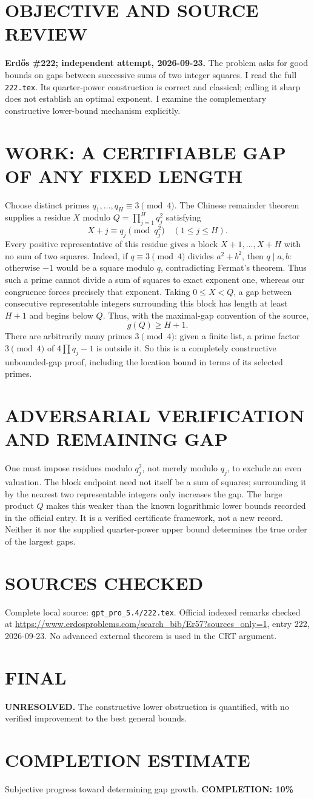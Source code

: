 \section{OBJECTIVE AND SOURCE REVIEW}
\textbf{Erd\H{o}s \#222; independent attempt, 2026-09-23.}
The problem asks for good bounds on gaps between successive sums of two integer squares. I read the full \texttt{222.tex}. Its quarter-power construction is correct and classical; calling it sharp does not establish an optimal exponent. I examine the complementary constructive lower-bound mechanism explicitly.
\section{WORK: A CERTIFIABLE GAP OF ANY FIXED LENGTH}
Choose distinct primes $q_1,\ldots,q_H\equiv3\pmod4$. The Chinese remainder theorem supplies a residue $X$ modulo $Q=\prod_{j=1}^Hq_j^2$ satisfying
\[
X+j\equiv q_j\pmod {q_j^2}\quad(1\le j\le H).
\]
Every positive representative of this residue gives a block $X+1,\ldots,X+H$ with no sum of two squares. Indeed, if $q\equiv3\pmod4$ divides $a^2+b^2$, then $q\mid a,b$: otherwise $-1$ would be a square modulo $q$, contradicting Fermat's theorem. Thus such a prime cannot divide a sum of squares to exact exponent one, whereas our congruence forces precisely that exponent.
Taking $0\le X<Q$, a gap between consecutive representable integers surrounding this block has length at least $H+1$ and begins below $Q$. Thus, with the maximal-gap convention of the source,
\[
g(Q)\ge H+1.
\]
There are arbitrarily many primes $3\pmod4$: given a finite list, a prime factor $3\pmod4$ of $4\prod q_j-1$ is outside it. So this is a completely constructive unbounded-gap proof, including the location bound in terms of its selected primes.
\section{ADVERSARIAL VERIFICATION AND REMAINING GAP}
One must impose residues modulo $q_j^2$, not merely modulo $q_j$, to exclude an even valuation. The block endpoint need not itself be a sum of squares; surrounding it by the nearest two representable integers only increases the gap. The large product $Q$ makes this weaker than the known logarithmic lower bounds recorded in the official entry. It is a verified certificate framework, not a new record. Neither it nor the supplied quarter-power upper bound determines the true order of the largest gaps.
\section{SOURCES CHECKED}
Complete local source: \texttt{gpt\_pro\_5.4/222.tex}. Official indexed remarks checked at \url{https://www.erdosproblems.com/search_bib/Er57?sources_only=1}, entry 222, 2026-09-23. No advanced external theorem is used in the CRT argument.
\section{FINAL}
\textbf{UNRESOLVED.} The constructive lower obstruction is quantified, with no verified improvement to the best general bounds.
\section{COMPLETION ESTIMATE}
Subjective progress toward determining gap growth.
\textbf{COMPLETION: 10\%}
